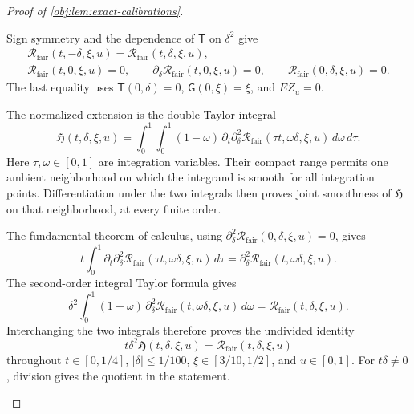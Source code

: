 \begin{proof}[Proof of \cref{obj:lem:exact-calibrations}]
\begin{enumerate}
Sign symmetry and the dependence of \(\mathsf T\) on \(\delta^2\) give
\[
\begin{gathered}
\mathcal R_{\mathrm{fair}}(t,-\delta,\xi,u)
=\mathcal R_{\mathrm{fair}}(t,\delta,\xi,u),\\
\mathcal R_{\mathrm{fair}}(t,0,\xi,u)=0,
\qquad
\partial_\delta\mathcal R_{\mathrm{fair}}(t,0,\xi,u)=0,
\qquad
\mathcal R_{\mathrm{fair}}(0,\delta,\xi,u)=0.
\end{gathered}
\]
The last equality uses \(\mathsf T(0,\delta)=0\),
\(\mathsf G(0,\xi)=\xi\), and \(EZ_u=0\).

The normalized extension is the double Taylor integral
\[
\mathfrak H(t,\delta,\xi,u)
=
\int_0^1\int_0^1
(1-\omega)\,
\partial_t\partial_\delta^2
\mathcal R_{\mathrm{fair}}(\tau t,\omega\delta,\xi,u)
\,d\omega\,d\tau.
\]
Here \(\tau,\omega\in[0,1]\) are integration variables. Their compact range permits one ambient neighborhood on which the integrand is smooth for all integration points. Differentiation under the two integrals then proves joint smoothness of \(\mathfrak H\) on that neighborhood, at every finite order.

The fundamental theorem of calculus, using
\(\partial_\delta^2\mathcal R_{\mathrm{fair}}(0,\delta,\xi,u)=0\), gives
\[
t\int_0^1
\partial_t\partial_\delta^2
\mathcal R_{\mathrm{fair}}(\tau t,\omega\delta,\xi,u)\,d\tau
=
\partial_\delta^2
\mathcal R_{\mathrm{fair}}(t,\omega\delta,\xi,u).
\]
The second-order integral Taylor formula gives
\[
\delta^2\int_0^1
(1-\omega)\,
\partial_\delta^2
\mathcal R_{\mathrm{fair}}(t,\omega\delta,\xi,u)\,d\omega
=
\mathcal R_{\mathrm{fair}}(t,\delta,\xi,u).
\]
Interchanging the two integrals therefore proves the undivided identity
\[
t\delta^2\mathfrak H(t,\delta,\xi,u)
=\mathcal R_{\mathrm{fair}}(t,\delta,\xi,u)
\]
throughout
\(t\in[0,1/4]\), \(|\delta|\le1/100\),
\(\xi\in[3/10,1/2]\), and \(u\in[0,1]\).
For \(t\delta\ne0\), division gives the quotient in the statement.


\end{enumerate}
\end{proof}
